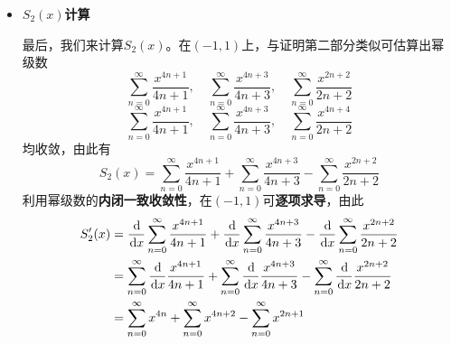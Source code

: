 \documentclass[a4paper,UTF8,fontset=windows,AutoFakeBold]{ctexart}
\newcommand*{\dr}{\hspace{0.07em}\mathrm{d}}
\newcommand*{\suminf}[1][n=1]{\sum_{#1}^\infty}
\newcommand*{\note}{\noindent *}
\theoremstyle{ex}
\newcommand{\exref}[1]{\textbf{题\;\ref{#1}\;}}
\begin{document}
\begin{framed}
{\begin{itemize}
        利用\textbf{基本初等函数的泰勒级数}可知
        $$\forall t\in(-1,1),\quad\suminf[t=0]t^n=\frac{1}{1-t}$$
        代入$t=x^4$\ ($x\in(-1,1)$时也有$t\in(-1,1)$)即知
        $$\suminf[n=0]x^{4n}=\frac{1}{1-x^4}$$
        再乘1、$x^2$与$2x^3$\ (严谨性类似\exref{poly close}第一部分分析)即得到$(-1,1)$中
        $$S'(x)=\frac{1+x^2-2x^3}{1-x^4}$$
        可将其因式分解后进一步化简为
        $$S'(x)=\frac{2x^2+x+1}{(x+1)(x^2+1)}=\frac{1}{x+1}+\frac{x}{x^2+1}$$

        由定义可发现$S(0)=0$，积分即得到$(-1,1)$中有(第二部分换元$s=t^2$)
        $$\int_0^x\frac{1}{t+1}\dr t=\ln(t+1)$$
        $$\int_0^x\frac{t\dr t}{t^2+1}=\int_0^{x^2}\frac{\dr s}{2(s+1)}=\frac{1}{2}\ln(x^2+1)$$
        综合以上即得
        $$S(x)=\ln(x+1)+\frac{1}{2}\ln(x^2+1)$$
        利用幂级数的\textbf{内闭一致收敛性}，幂级数的和函数在收敛域必然\textbf{连续}，再由\textbf{初等函数连续性}结论即得
        $$\forall x\in(-1,1],\quad S_1(x)=S(x)=\ln(x+1)+\frac{1}{2}\ln(x^2+1)$$

        \note 注意不引入幂级数就\textbf{无法说明1处连续性}，因此我们才需要额外引入$S(x)$。

        题中要算的数项级数即为$S(x)=S_1(x)$在1处的值，由此可知
        $$\suminf[n=0]\bigg(\frac{1}{4n+1}+\frac{1}{4n+3}-\frac{1}{2n+2}\bigg)=\frac{3}{2}\ln2$$
        
        \item \textbf{$S_2(x)$计算}
        
        最后，我们来计算$S_2(x)$。在$(-1,1)$上，与证明第二部分类似可估算出幂级数
        $$\suminf[n=0]\frac{x^{4n+1}}{4n+1},\quad\suminf[n=0]\frac{x^{4n+3}}{4n+3},\quad\suminf[n=0]\frac{x^{2n+2}}{2n+2}$$
        $$\suminf[n=0]\frac{x^{4n+1}}{4n+1},\quad\suminf[n=0]\frac{x^{4n+3}}{4n+3},\quad\suminf[n=0]\frac{x^{4n+4}}{2n+2}$$
        均收敛，由此有
        $$S_2(x)=\suminf[n=0]\frac{x^{4n+1}}{4n+1}+\suminf[n=0]\frac{x^{4n+3}}{4n+3}-\suminf[n=0]\frac{x^{2n+2}}{2n+2}$$
        利用幂级数的\textbf{内闭一致收敛性}，在$(-1,1)$可\textbf{逐项求导}，由此
        $$\begin{aligned}S_2'(x)&=\frac{\dr}{\dr x}\suminf[n=0]\frac{x^{4n+1}}{4n+1}+\frac{\dr}{\dr x}\suminf[n=0]\frac{x^{4n+3}}{4n+3}-\frac{\dr}{\dr x}\suminf[n=0]\frac{x^{2n+2}}{2n+2}\\ &=\suminf[n=0]\frac{\dr}{\dr x}\frac{x^{4n+1}}{4n+1}+\suminf[n=0]\frac{\dr}{\dr x}\frac{x^{4n+3}}{4n+3}-\suminf[n=0]\frac{\dr}{\dr x}\frac{x^{2n+2}}{2n+2}\\ &=\suminf[n=0]x^{4n}+\suminf[n=0]x^{4n+2}-\suminf[n=0]x^{2n+1}\end{aligned}$$


\end{itemize}}
\end{framed}
\end{document}
